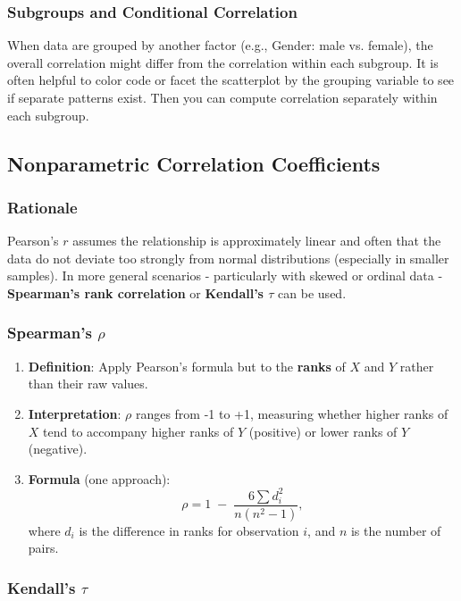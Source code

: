 \documentclass[10pt]{extarticle}
\begin{document}
\subsubsection{Subgroups and Conditional Correlation}

When data are grouped by another factor (e.g., Gender: male vs. female), the overall correlation might differ from the correlation within each subgroup. It is often helpful to color code or facet the scatterplot by the grouping variable to see if separate patterns exist. Then you can compute correlation separately within each subgroup.


\subsection{Nonparametric Correlation Coefficients}

\subsubsection{Rationale}

Pearson's $r$ assumes the relationship is approximately linear and often that the data do not deviate too strongly from normal distributions (especially in smaller samples). In more general scenarios - particularly with skewed or ordinal data - \textbf{Spearman's rank correlation} or \textbf{Kendall's $\tau$} can be used.

\subsubsection{Spearman's $\rho$}

\begin{enumerate}
    \item \textbf{Definition}: Apply Pearson's formula but to the \textbf{ranks} of $X$ and $Y$ rather than their raw values.
    \item \textbf{Interpretation}: $\rho$ ranges from -1 to +1, measuring whether higher ranks of $X$ tend to accompany higher ranks of $Y$ (positive) or lower ranks of $Y$ (negative).
    \item \textbf{Formula} (one approach):
          \[
              \rho = 1 \;-\; \frac{6 \sum d_i^2}{n (n^2 - 1)},
          \]
          where $d_i$ is the difference in ranks for observation $i$, and $n$ is the number of pairs.
\end{enumerate}

\subsubsection{Kendall's $\tau$}
\end{document}
